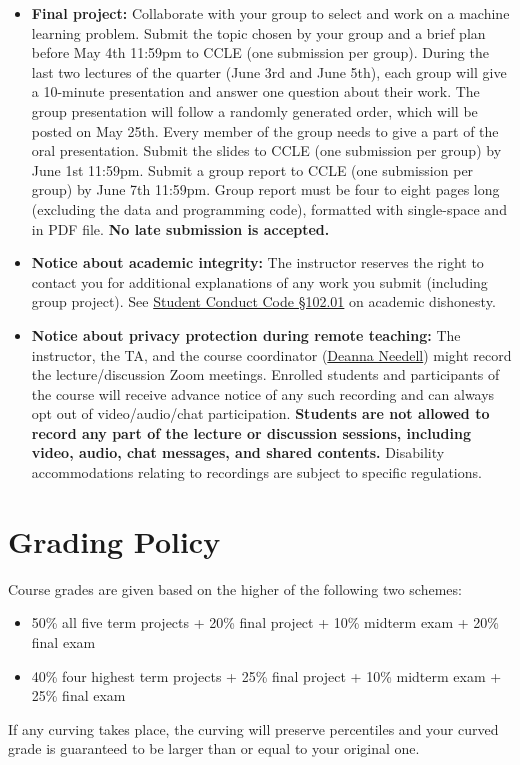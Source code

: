 \documentclass[11pt]{article}
\begin{document}
\begin{itemize}
  \item \textbf{Final project:} 
  Collaborate with your group to select and work on a machine learning problem. 
  Submit the topic chosen by your group and a brief plan before May 4th 11:59pm to CCLE (one submission per group).
  During the last two lectures of the quarter (June 3rd and June 5th), each group will give a 10-minute presentation and answer one question about their work. 
  The group presentation will follow a randomly generated order, which will be posted on May 25th.
  Every member of the group needs to give a part of the oral presentation. 
  Submit the slides to CCLE (one submission per group) by June 1st 11:59pm. 
  Submit a group report to CCLE (one submission per group) by June 7th 11:59pm. 
  Group report must be four to eight pages long (excluding the data and programming code), formatted with single-space and in PDF file. \textbf{No late submission is accepted. }
  
  \item \textbf{Notice about academic integrity:} The instructor reserves the right to contact you for additional explanations of any work you submit (including group project). See \href{https://www.deanofstudents.ucla.edu/Individual-Student-Code#academicdis7}{Student Conduct Code \S 102.01} on academic dishonesty.
  
  \item \textbf{Notice about privacy protection during remote teaching:} The instructor, the TA, and the course coordinator (\href{https://www.math.ucla.edu/~deanna/}{Deanna Needell}) might record the lecture/discussion Zoom meetings. 
  Enrolled students and participants of the course will receive advance notice of any such recording and can always opt out of video/audio/chat participation. 
  \textbf{Students are not allowed to record any part of the lecture or discussion sessions, including video, audio, chat messages, and shared contents.} 
  Disability accommodations relating to recordings are subject to specific regulations. 
\end{itemize}

\section*{Grading Policy}
Course grades are given based on the higher of the following two schemes:
\begin{itemize}
  \item 50\% all five term projects + 20\% final project + 10\% midterm exam + 20\% final exam
  \item 40\% four highest term projects + 25\% final project + 10\% midterm exam + 25\% final exam
  \end{itemize}
If any curving takes place, the curving will preserve percentiles and your curved grade is guaranteed to be larger than or equal to your original one.
\end{document}
